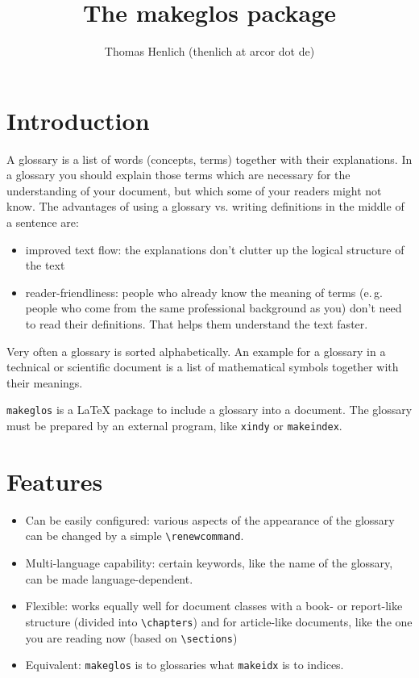 \documentclass[a4paper]{article}
\title{The makeglos package}
\author{Thomas Henlich (thenlich at arcor dot de)}
\begin{document}
\maketitle
\tableofcontents
\renewcommand{\glossaryintro}{Now follows a very short glossary:}
\printglossary
{}

\section{Introduction}

A glossary is a list of words (concepts, terms) together with their
explanations.
In a glossary you should explain those terms which are
necessary for the understanding of your document, but which some of your
readers might not know. The advantages of using a glossary vs. writing
definitions in the middle of a sentence are:

\begin{itemize}
  \item improved text flow: the explanations don't clutter up the logical
    structure of the text
  \item reader-friendliness: people who already know the meaning of terms
    (e.\,g. people who come from the same professional background as you)
    don't need to read their definitions. That helps them understand the
    text faster.
\end{itemize}

Very often a glossary is sorted alphabetically. An example for a glossary in
a technical or scientific document is a list of mathematical symbols
together with their meanings.

{\tt makeglos} is a \LaTeX{} package to include a glossary into a document.
The glossary must be prepared by an external program, like {\tt xindy} or
{\tt makeindex}.


\section{Features}

\begin{itemize}
  \item Can be easily configured: various aspects of the appearance of the
    glossary can be changed by a simple \verb+\renewcommand+.
  \item Multi-language capability: certain keywords, like the name of the
    glossary, can be made language-dependent.
  \item Flexible: works equally well for document classes with a book- or
    report-like structure (divided into \verb+\chapters+) and for article-like
    documents, like the one you are reading now (based on \verb+\sections+)
  \item Equivalent: \verb+makeglos+ is to glossaries what \verb+makeidx+ is
    to indices.
\end{itemize}
\end{document}
